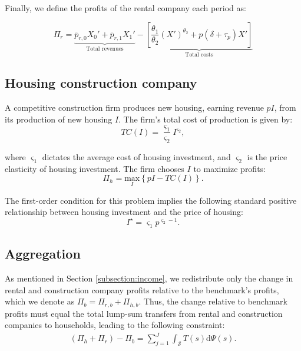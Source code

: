 \documentclass[parskip=full]{article}
\begin{document}
Finally, we define the profits of the rental company each period as:

\begin{equation}
    \Pi_r=\underbrace{\overline{p}_{r,0}X_0'+\overline{p}_{r,1} X_1'}_{\text{Total revenues}}-\underbrace{\left[\frac{\theta_1}{\theta_2}(X')^{\theta_2}+p(\delta+\tau_p) X'\right]}_{\text{Total costs}}
\end{equation}

\subsection{Housing construction company}\label{sec:construction_company}

A competitive construction firm produces new housing, earning revenue $pI$, from its production of new housing $I$. The firm's total cost of production is given by:
\begin{equation*}
TC(I)=\frac{\varsigma_{1}}{\varsigma_{2}}I^{\varsigma_{2}}\label{eq:total_cost_structure},
\end{equation*}

\noindent where $\varsigma_{1}$ dictates the average cost of housing investment, and $\varsigma_{2}$ is the price elasticity of housing investment. The firm chooses $I$ to maximize profits:
\begin{equation*}
\label{eq:construction_company_profits}
\Pi_h= \underset{I} {\text{$\mbox{max}$}}{\left\{p I-TC(I)\right\}}.
\end{equation*}

\noindent The first-order condition for this problem implies the following standard positive relationship between housing investment and the price of housing:
\begin{equation}
\label{eq:construction_company_first_order_condition}
I^{\star}=\varsigma_{1} p^{\varsigma_{2}-1}.
\end{equation}

\subsection{Aggregation}\label{subsection:aggregation}

As mentioned in Section \ref{subsection:income}, we redistribute only the change in rental and construction company profits relative to the benchmark's profits, which we denote as $\Pi_b=\Pi_{r,b}+\Pi_{h,b}$. Thus, the change relative to benchmark profits must equal the total lump-sum transfers from rental and construction companies to households, leading to the following constraint:
\begin{align}\label{eq:rebates}
   (\Pi_h+\Pi_r)-\Pi_b=\sum_{j=1}^J \int_\mathcal{S} T(s)\mathrm{d}\Psi(s).
\end{align}
\end{document}
